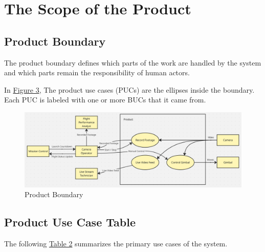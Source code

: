 \documentclass[12pt]{article}
\begin{document}
\section{The Scope of the Product}
\subsection{Product Boundary}

The product boundary defines which parts of the work are handled by the system
and which parts remain the responsibility of human actors.

In \hyperref[img:product-boundary]{Figure 3}, The product use cases (PUCs) are
the ellipses inside the boundary. Each PUC is labeled with one or more BUCs
that it came from.

\FloatBarrier
\begin{figure}[h]
  \centering
  \includegraphics[width=\textwidth,height=\textheight,keepaspectratio]{../Images/product_boundary.png}
  \caption{Product Boundary}
  \label{img:product-boundary}
\end{figure}
\FloatBarrier

\subsection{Product Use Case Table}

The following \hyperref[tab:product-use-case-table]{Table 2} summarizes the
primary use cases of the system.
\end{document}
